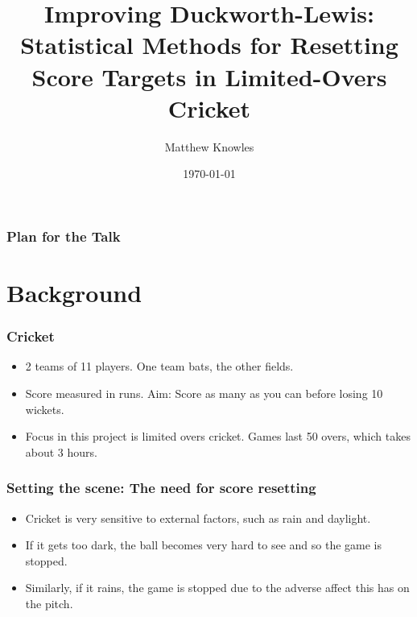 \documentclass{beamer}
\title[Improving DLS]{Improving Duckworth-Lewis: Statistical Methods for Resetting Score Targets in Limited-Overs Cricket}
\author{Matthew Knowles}
\institute[UoY] 
{
University of York \\ 
\medskip
\textit{mk1320@york.ac.uk} 
}
\date{\today}
\begin{document}
\begin{frame}
\titlepage 
\end{frame}

\begin{frame}
\frametitle{Plan for the Talk} 
\tableofcontents 
\end{frame}

\section{Background}
\begin{frame}
\frametitle{Cricket}

\begin{itemize}
    \item 2 teams of 11 players. One team bats, the other fields. \\
    \pause
    \item Score measured in runs. Aim: Score as many as you can before losing 10 wickets. \\
    \pause
    \item Focus in this project is limited overs cricket. Games last 50 overs, which takes about 3 hours.
\end{itemize}

\end{frame}

\begin{frame}
\frametitle{Setting the scene: The need for score resetting}

\begin{itemize}
    \item Cricket is very sensitive to external factors, such as rain and daylight. \\
    \item If it gets too dark, the ball becomes very hard to see and so the game is stopped. \\
    \item Similarly, if it rains, the game is stopped due to the adverse affect this has on the pitch. \\
\end{itemize}
    
\end{frame}
\end{document}

